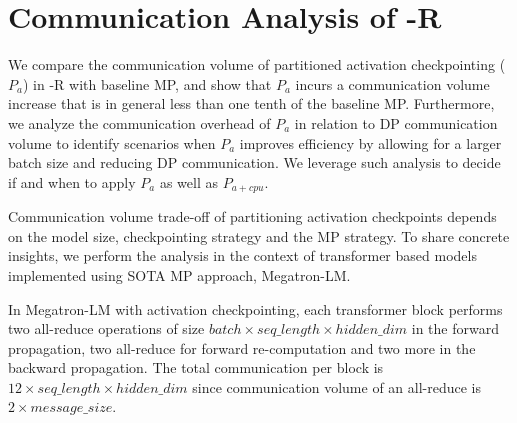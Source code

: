 \begin{comment}
\subsection{Communication Latency}
Here we want to point out that while our optimizations impact communication latency, its impact to overall performance is likely small. Note that $P_g$ implements a reduce-scatter as a sequential series of reduce operations, and $P_p$ implements all-gather as a sequential series of broadcast operations.  Furthermore, $C_b$ can partition a large communication collective into multiple smaller ones to avoid memory overhead. Clearly, these sequential operations increases the communication latency. However, for large models with hundreds of billions of parameters, even with a large enough constant buffer size $C_B$, message sizes are large enough, that the communication time is bounded by the communication volume and communication bandwidth, and not by latency.
\end{comment}

\section{Communication Analysis of \name-R}
We compare the communication volume of partitioned activation checkpointing ($P_a$) in \name-R with baseline MP, and show that $P_a$ incurs a communication volume increase that is in general less than one tenth of the baseline MP. Furthermore, we analyze the communication overhead of $P_a$ in relation to DP communication volume to identify scenarios when $P_a$ improves efficiency by allowing for a larger batch size and reducing DP communication.  We leverage such analysis to decide if and when to apply  $P_a$ as well as $P_{a+cpu}$.  

Communication volume trade-off of partitioning activation checkpoints depends on the model size, checkpointing strategy and the MP strategy.  To share concrete insights, we perform the analysis in the context of transformer based models implemented using SOTA MP approach, Megatron-LM.

In Megatron-LM with activation checkpointing, each transformer block performs two all-reduce operations of size $batch \times seq\_length \times hidden\_dim$ in the forward propagation, two all-reduce for forward re-computation and two more in the backward propagation.  The total communication per block is $12 \times seq\_length \times hidden\_dim$ since communication volume of an all-reduce is $2 \times message\_size$. 

